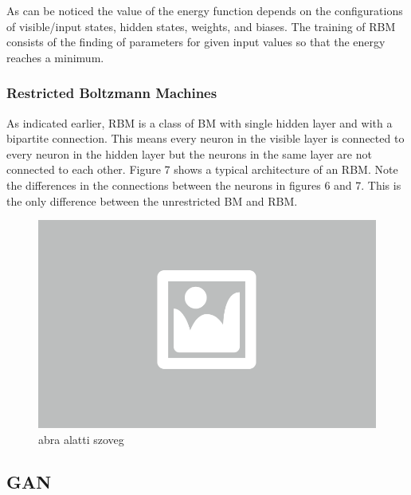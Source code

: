 
As can be noticed the value of the energy function depends on the configurations of visible/input states, hidden states, weights, and biases. The training of RBM consists of the finding of parameters for given input values so that the energy reaches a minimum.

\subsubsection{Restricted Boltzmann Machines}

As indicated earlier, RBM is a class of BM with single hidden layer and with a bipartite connection. This means every neuron in the visible layer is connected to every neuron in the hidden layer but the neurons in the same layer are not connected to each other. Figure 7 shows a typical architecture of an RBM. Note the differences in the connections between the neurons in figures 6 and 7. This is the only difference between the unrestricted BM and RBM.

\begin{figure}[ht]
	\centering
	\includegraphics[width=0.65\columnwidth]{figures/abra.png}
	\caption{abra alatti szoveg}
\end{figure}


\subsection{GAN}

